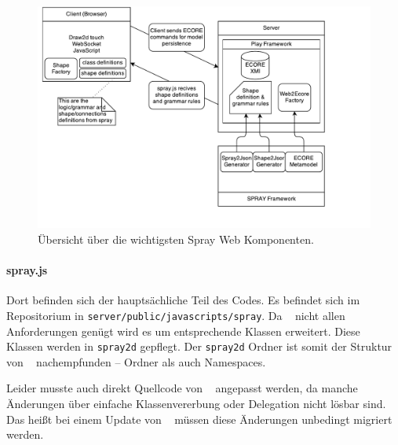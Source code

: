 \begin{figure}[h!]
  \centering
  \includegraphics[width=1.0\textwidth]{Figures/ComponentOverview.pdf}
  \caption{Übersicht über die wichtigsten Spray Web Komponenten.}\label{fig.ComponentOverview}
\end{figure}

\paragraph{spray.js} Dort befinden sich der hauptsächliche Teil des Codes.
Es befindet sich im Repositorium in {\tt server/public/javascripts/spray}.
Da \dd~ nicht allen Anforderungen genügt wird es um entsprechende Klassen erweitert.
Diese \dd~ Klassen werden in {\tt spray2d} gepflegt.
Der {\tt spray2d} Ordner ist somit der Struktur von \dd~ nachempfunden -- Ordner
als auch Namespaces.

Leider musste auch direkt Quellcode von \dd~ angepasst werden, da manche Änderungen
über einfache Klassenvererbung oder Delegation nicht lösbar sind.
Das heißt bei einem Update von \dd~ müssen diese Änderungen unbedingt migriert werden.
